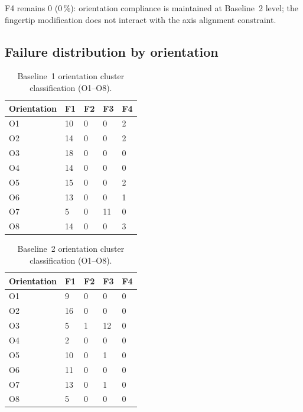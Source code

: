 \documentclass[12pt, a4paper]{report}
\begin{document}
F4 remains 0 (0\,\%): orientation compliance is maintained at Baseline~2 level; the fingertip modification does not interact with the axis alignment constraint.

\subsection{Failure distribution by orientation}
\label{sec:failure-distribution-by-orientation}

\begin{table}[htbp]
  \centering
  \caption{Baseline~1 orientation cluster classification (O1--O8).}
  \label{tab:baseline1_orientation_clusters}
  \begin{tabular}{lllll}
    \toprule
    Orientation & F1 & F2 & F3 & F4 \\
    \midrule
    O1 & 10 & 0 & 0 & 2 \\
    O2 & 14 & 0 & 0 & 2 \\
    O3 & 18 & 0 & 0 & 0 \\
    O4 & 14 & 0 & 0 & 0 \\
    O5 & 15 & 0 & 0 & 2 \\
    O6 & 13 & 0 & 0 & 1 \\
    O7 & 5 & 0 & 11 & 0\\
    O8 & 14 & 0 & 0 & 3 \\
    \bottomrule
  \end{tabular}
\end{table}

\begin{table}[htbp]
  \centering
  \caption{Baseline~2 orientation cluster classification (O1--O8).}
  \label{tab:baseline2_orientation_clusters}
  \begin{tabular}{lllll}
    \toprule
    Orientation & F1 & F2 & F3 & F4 \\
    \midrule
    O1 & 9 & 0 & 0 & 0 \\
    O2 & 16 & 0 & 0 & 0 \\
    O3 & 5 & 1 & 12 & 0 \\
    O4 & 2 & 0 & 0 & 0 \\
    O5 & 10 & 0 & 1 & 0 \\
    O6 & 11 & 0 & 0 & 0 \\
    O7 & 13 & 0 & 1 & 0\\
    O8 & 5 & 0 & 0 & 0 \\
    \bottomrule
  \end{tabular}
\end{table}
\end{document}
